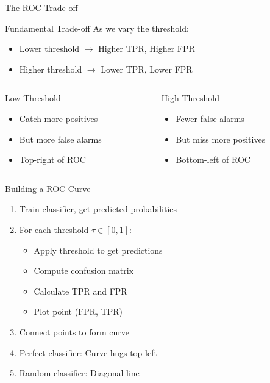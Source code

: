 \documentclass{beamer}
\begin{document}
\begin{frame}{The ROC Trade-off}
\begin{keypointsbox}{Fundamental Trade-off}
As we vary the threshold:
\begin{itemize}
    \item Lower threshold $\rightarrow$ Higher TPR, Higher FPR
    \item Higher threshold $\rightarrow$ Lower TPR, Lower FPR
\end{itemize}
\end{keypointsbox}

\vspace{0.3cm}

\begin{columns}
\begin{column}{0.48\textwidth}
\begin{block}{Low Threshold}
\begin{itemize}
    \item Catch more positives
    \item But more false alarms
    \item Top-right of ROC
\end{itemize}
\end{block}
\end{column}

\begin{column}{0.48\textwidth}
\begin{block}{High Threshold}
\begin{itemize}
    \item Fewer false alarms
    \item But miss more positives
    \item Bottom-left of ROC
\end{itemize}
\end{block}
\end{column}
\end{columns}
\end{frame}

\begin{frame}{Building a ROC Curve}
\begin{enumerate}
    \item Train classifier, get predicted probabilities
    \item For each threshold $\tau \in [0, 1]$:
    \begin{itemize}
        \item Apply threshold to get predictions
        \item Compute confusion matrix
        \item Calculate TPR and FPR
        \item Plot point (FPR, TPR)
    \end{itemize}
    \item Connect points to form curve
    \item Perfect classifier: Curve hugs top-left
    \item Random classifier: Diagonal line
\end{enumerate}
\end{frame}
\end{document}
